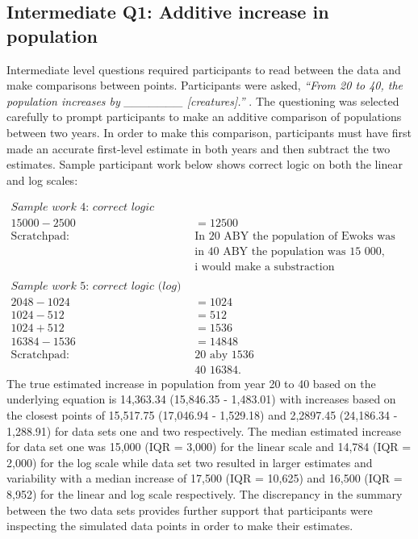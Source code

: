 \documentclass[print]{nuthesis}
\begin{document}
\hypertarget{intermediate-q1-additive-increase-in-population}{%
\subsection{Intermediate Q1: Additive increase in population}\label{intermediate-q1-additive-increase-in-population}}

Intermediate level questions required participants to read between the data and make comparisons between points.
Participants were asked, \emph{``From 20 to 40, the population increases by \_\_\_\_\_\_\_ {[}creatures{]}.''} .
The questioning was selected carefully to prompt participants to make an additive comparison of populations between two years.
In order to make this comparison, participants must have first made an accurate first-level estimate in both years and then subtract the two estimates.
Sample participant work below shows correct logic on both the linear and log scales:

\begin{align}
\textit{Sample work 4: correct logic (linear)} \nonumber\\
15000 - 2500 & = 12500\nonumber\\
\text{Scratchpad: } &\text{In 20 ABY the population of Ewoks was 2500,}\nonumber\\
                   &\text{in 40 ABY the population was 15 000,}\nonumber\\
                   &\text{i would make a substraction}\nonumber\\
\nonumber\\
\textit{Sample work 5: correct logic (log)} \nonumber\\
2048 - 1024  & = 1024 \nonumber\\
1024 - 512   & = 512 \nonumber\\
1024 + 512   & = 1536 \nonumber\\
16384 - 1536 & = 14848 \nonumber\\
\text{Scratchpad: }  & \text{20 aby 1536} \nonumber\\
             & \text{40 16384.} \nonumber
\end{align}
The true estimated increase in population from year 20 to 40 based on the underlying equation is 14,363.34 (15,846.35 - 1,483.01) with increases based on the closest points of 15,517.75 (17,046.94 - 1,529.18) and 2,2897.45 (24,186.34 - 1,288.91) for data sets one and two respectively.
The median estimated increase for data set one was 15,000 (IQR = 3,000) for the linear scale and 14,784 (IQR = 2,000) for the log scale while data set two resulted in larger estimates and variability with a median increase of 17,500 (IQR = 10,625) and 16,500 (IQR = 8,952) for the linear and log scale respectively.
The discrepancy in the summary between the two data sets provides further support that participants were inspecting the simulated data points in order to make their estimates.
\end{document}
